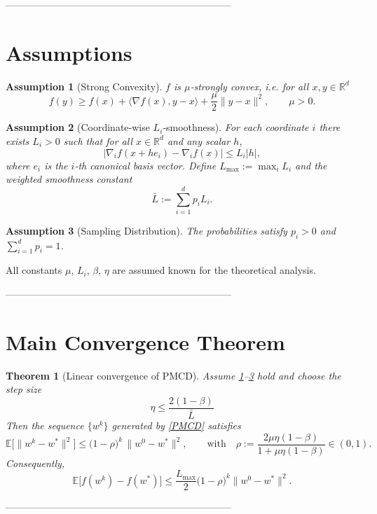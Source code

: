 \documentclass{article}
\newtheorem{theorem}{Theorem}
\newtheorem{assumption}{Assumption}
\newcommand{\E}{\mathbb{E}}
\newcommand{\R}{\mathbb{R}}
\begin{document}
---------------------------------------------------------------------

\section*{Assumptions}
\begin{assumption}[Strong Convexity]\label{as:strong}
$f$ is $\mu$‑strongly convex, i.e. for all $x,y\in\R^{d}$
\[
f(y)\ge f(x)+\langle\nabla f(x),y-x\rangle+\frac{\mu}{2}\|y-x\|^{2},
\qquad \mu>0.
\]
\end{assumption}

\begin{assumption}[Coordinate‑wise $L_i$‑smoothness]\label{as:smooth}
For each coordinate $i$ there exists $L_i>0$ such that for all $x\in\R^{d}$ and
any scalar $h$,
\[
\bigl|\nabla_i f(x+he_i)-\nabla_i f(x)\bigr|\le L_i|h|,
\]
where $e_i$ is the $i$‑th canonical basis vector.
Define $L_{\max}:=\max_i L_i$ and the weighted smoothness constant
\[
\bar L:=\sum_{i=1}^{d}p_i L_i .
\]
\end{assumption}

\begin{assumption}[Sampling Distribution]\label{as:prob}
The probabilities satisfy $p_i>0$ and $\sum_{i=1}^{d}p_i=1$.
\end{assumption}

All constants $\mu$, $L_i$, $\beta$, $\eta$ are assumed known for the
theoretical analysis.

---------------------------------------------------------------------

\section*{Main Convergence Theorem}
\begin{theorem}[Linear convergence of PMCD]\label{thm:linear}
Assume \ref{as:strong}–\ref{as:prob} hold and choose the step size
\[
\boxed{\;\eta\le \frac{2(1-\beta)}{\bar L}\;}
\tag{T1}
\]
Then the sequence $\{w^{k}\}$ generated by \eqref{PMCD} satisfies
\[
\E\!\bigl[\|w^{k}-w^{*}\|^{2}\bigr]\le
\bigl(1-\rho\bigr)^{k}\,\|w^{0}-w^{*}\|^{2},
\qquad\text{with}\quad
\rho:=\frac{2\mu\eta(1-\beta)}{1+\mu\eta(1-\beta)}\in(0,1).
\tag{T2}
\]
Consequently,
\[
\E\!\bigl[f(w^{k})-f(w^{*})\bigr]\le
\frac{L_{\max}}{2}\bigl(1-\rho\bigr)^{k}\|w^{0}-w^{*}\|^{2}.
\]
\end{theorem}

---------------------------------------------------------------------
\end{document}
